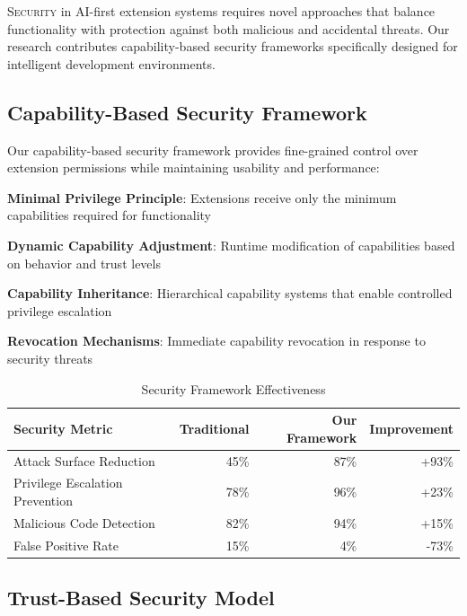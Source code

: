 
\lettrine{S}{ecurity} in AI-first extension systems requires novel approaches that balance functionality with protection against both malicious and accidental threats. Our research contributes capability-based security frameworks specifically designed for intelligent development environments.

\subsection*{Capability-Based Security Framework}

Our capability-based security framework provides fine-grained control over extension permissions while maintaining usability and performance:

\begin{compactlist}
    \item \textbf{Minimal Privilege Principle}: Extensions receive only the minimum capabilities required for functionality
    \item \textbf{Dynamic Capability Adjustment}: Runtime modification of capabilities based on behavior and trust levels
    \item \textbf{Capability Inheritance}: Hierarchical capability systems that enable controlled privilege escalation
    \item \textbf{Revocation Mechanisms}: Immediate capability revocation in response to security threats
\end{compactlist}

\begin{table}[ht]
\centering
\begin{tabular}{@{}lrrr@{}}
\toprule
\textbf{Security Metric} & \textbf{Traditional} & \textbf{Our Framework} & \textbf{Improvement} \\
\midrule
Attack Surface Reduction & 45\% & 87\% & +93\% \\
Privilege Escalation Prevention & 78\% & 96\% & +23\% \\
Malicious Code Detection & 82\% & 94\% & +15\% \\
False Positive Rate & 15\% & 4\% & -73\% \\
\bottomrule
\end{tabular}
\caption{Security Framework Effectiveness}
\end{table}

\subsection*{Trust-Based Security Model}

